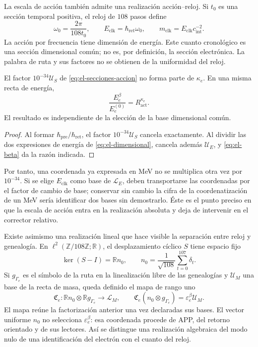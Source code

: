 La escala de acción también admite una realización acción--reloj. Si
\(t_0\) es una sección temporal positiva, el reloj de \(108\) pasos
define
\begin{equation}
 \omega_0=\frac{2\pi}{108t_0},\qquad
 E_{\mathrm{clk}}=\hbar_{\mathrm{ret}}\omega_0,\qquad
 m_{\mathrm{clk}}=E_{\mathrm{clk}}c_{\mathrm{int}}^{-2}.
 \label{eq:el-cuanto-reloj}
\end{equation}
La acción por frecuencia tiene dimensión de energía. Este cuanto
cronológico es una sección dimensional común; no es, por definición,
la sección electrónica. La palabra de ruta y sus factores no se
obtienen de la uniformidad del reloj.

\begin{proposition}
El factor \(10^{-34}\mathcal U_S\) de
\eqref{eq:el-secciones-accion} no forma parte de \(\kappa_e\). En
una misma recta de energía,
\begin{equation}
 \frac{E_e^\beta}{E_e^{(0)}}=R_{\mathrm{act}}^{\kappa_e}.
 \label{eq:el-razon-energia}
\end{equation}
El resultado es independiente de la elección de la base dimensional
común.
\end{proposition}
\begin{proof}
Al formar \(\hbar_{\mathrm{pre}}/\hbar_{\mathrm{ret}}\), el factor
\(10^{-34}\mathcal U_S\) cancela exactamente. Al dividir las dos
expresiones de energía de \eqref{eq:el-dimensional}, cancela además
\(\mathcal U_E\), y \eqref{eq:el-beta} da la razón indicada.
\end{proof}

Por tanto, una coordenada ya expresada en MeV no se multiplica otra vez
por \(10^{-34}\). Si se elige \(E_{\mathrm{clk}}\) como base de
\(\mathcal L_E\), deben transportarse las coordenadas por el factor
de cambio de base; conservar sin cambio la cifra de la coordenatización de un MeV
sería identificar dos bases sin demostrarlo. Éste es el punto preciso
en que la escala de acción entra en la realización absoluta y deja de
intervenir en el corrector relativo.

Existe asimismo una realización lineal que hace visible la separación
entre reloj y genealogía. En
\(\ell^2(\mathbb Z/108\mathbb Z;\mathbb R)\), el desplazamiento
cíclico \(S\) tiene espacio fijo
\[
 \ker(S-I)=\mathbb R n_0,\qquad
 n_0=\frac1{\sqrt{108}}\sum_{t=0}^{107}\delta_t.
\]
Si \(g_{\Gamma_e}\) es el símbolo de la ruta en la linealización libre
de las genealogías y \(\mathcal U_M\) una base de la recta de masa,
queda definido el mapa de rango uno
\begin{equation}
 \mathfrak C_e:
 \mathbb R n_0\otimes\mathbb R g_{\Gamma_e}\longrightarrow\mathcal L_M,
 \qquad
 \mathfrak C_e(n_0\otimes g_{\Gamma_e})
 =\varepsilon_e^\beta\mathcal U_M.
 \label{eq:el-rango-uno}
\end{equation}
El mapa reúne la factorización anterior una vez declaradas sus bases.
El vector uniforme \(n_0\) no selecciona \(\varepsilon_e^\beta\):
esa coordenada procede de APP, del retorno orientado y de sus lectores.
Así se distingue una realización algebraica del modo nulo de una
identificación del electrón con el cuanto del reloj.

